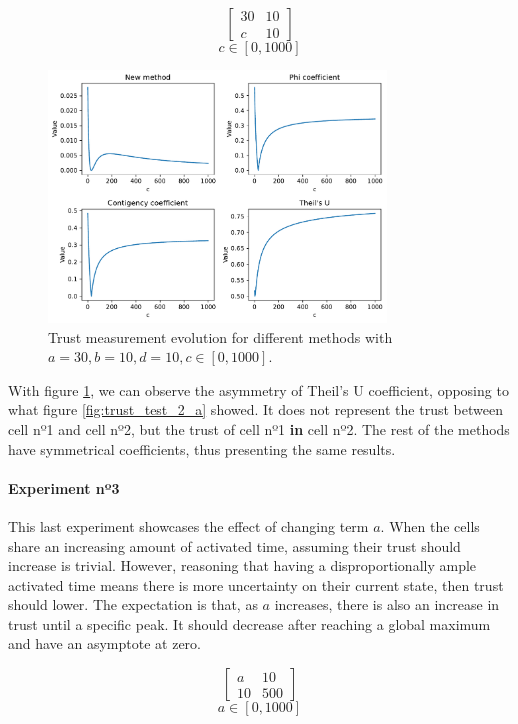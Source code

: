 $$
\begin{bmatrix}
    30 & 10 \\ c & 10
\end{bmatrix}
$$
$$
c \in [0, 1000]
$$
\begin{figure}[h!]
\centering
    \includegraphics[width=0.8\textwidth]{figures/chapter4/cell/trust_tests/2_b.pdf}
    \caption{Trust measurement evolution for different methods with $a=30, b=10, d=10, c \in [0, 1000]$.}
    \label{fig:trust_test_2_b}
\end{figure}
\FloatBarrier

With figure \ref{fig:trust_test_2_b}, we can observe the asymmetry of Theil's U coefficient, opposing to what figure \ref{fig:trust_test_2_a} showed. It does not represent the trust between cell nº1 and cell nº2, but the trust of cell nº1 \textbf{in} cell nº2. The rest of the methods have symmetrical coefficients, thus presenting the same results.

\paragraph{Experiment nº3} This last experiment showcases the effect of changing term $a$. When the cells share an increasing amount of activated time, assuming their trust should increase is trivial. However, reasoning that having a disproportionally ample activated time means there is more uncertainty on their current state, then trust should lower. The expectation is that, as $a$ increases, there is also an increase in trust until a specific peak. It should decrease after reaching a global maximum and have an asymptote at zero.

$$
\begin{bmatrix}
    a & 10 \\ 10 & 500
\end{bmatrix}
$$
$$
a \in [0, 1000]
$$

